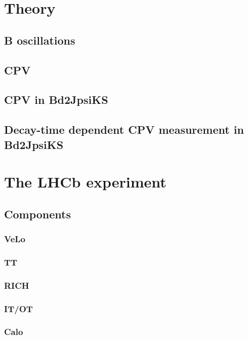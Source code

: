 
% 



\chapter{Theory}
\section{B oscillations}
\section{CPV}
\section{CPV in Bd2JpsiKS}
\section{Decay-time dependent CPV measurement in Bd2JpsiKS}

\chapter{The LHCb experiment}
\section{Components}
\subsection{VeLo}
\subsection{TT}
\subsection{RICH}
\subsection{IT/OT}
\subsection{Calo}
